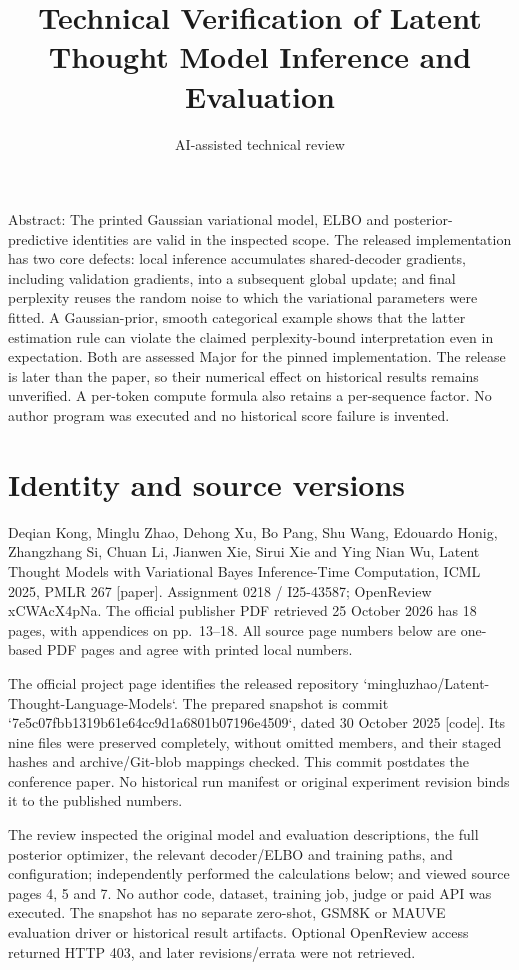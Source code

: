 \documentclass[10pt]{article}
\title{Technical Verification of Latent Thought Model Inference and Evaluation}
\author{AI-assisted technical review}
\date{}
\begin{document}
\maketitle
Abstract: The printed Gaussian variational model, ELBO and posterior-predictive identities are valid in the inspected scope. The released implementation has two core defects: local inference accumulates shared-decoder gradients, including validation gradients, into a subsequent global update; and final perplexity reuses the random noise to which the variational parameters were fitted. A Gaussian-prior, smooth categorical example shows that the latter estimation rule can violate the claimed perplexity-bound interpretation even in expectation. Both are assessed Major for the pinned implementation. The release is later than the paper, so their numerical effect on historical results remains unverified. A per-token compute formula also retains a per-sequence factor. No author program was executed and no historical score failure is invented.\par
\section*{Identity and source versions}
Deqian Kong, Minglu Zhao, Dehong Xu, Bo Pang, Shu Wang, Edouardo Honig, Zhangzhang Si, Chuan Li, Jianwen Xie, Sirui Xie and Ying Nian Wu, Latent Thought Models with Variational Bayes Inference-Time Computation, ICML 2025, PMLR 267 [paper]. Assignment 0218 / I25-43587; OpenReview xCWAcX4pNa. The official publisher PDF retrieved 25 October 2026 has 18 pages, with appendices on pp. 13–18. All source page numbers below are one-based PDF pages and agree with printed local numbers.\par
The official project page identifies the released repository `mingluzhao/Latent-Thought-Language-Models`. The prepared snapshot is commit `7e5c07fbb1319b61e64cc9d1a6801b07196e4509`, dated 30 October 2025 [code]. Its nine files were preserved completely, without omitted members, and their staged hashes and archive/Git-blob mappings checked. This commit postdates the conference paper. No historical run manifest or original experiment revision binds it to the published numbers.\par
The review inspected the original model and evaluation descriptions, the full posterior optimizer, the relevant decoder/ELBO and training paths, and configuration; independently performed the calculations below; and viewed source pages 4, 5 and 7. No author code, dataset, training job, judge or paid API was executed. The snapshot has no separate zero-shot, GSM8K or MAUVE evaluation driver or historical result artifacts. Optional OpenReview access returned HTTP 403, and later revisions/errata were not retrieved.\par
\end{document}
